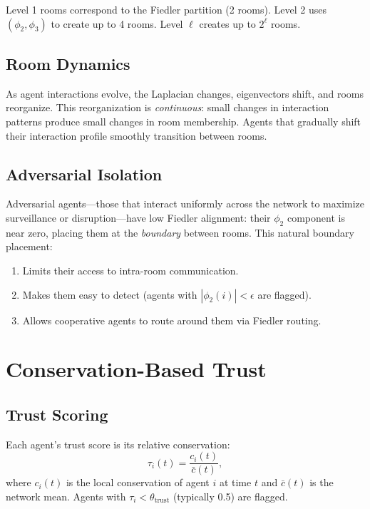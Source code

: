 \documentclass[11pt,a4paper]{article}
\begin{document}
Level 1 rooms correspond to the Fiedler partition (2 rooms).  Level 2 uses
$(\phi_2, \phi_3)$ to create up to 4 rooms.  Level $\ell$ creates up to
$2^\ell$ rooms.

\subsection{Room Dynamics}

As agent interactions evolve, the Laplacian changes, eigenvectors shift, and
rooms reorganize.  This reorganization is \emph{continuous}: small changes in
interaction patterns produce small changes in room membership.  Agents that
gradually shift their interaction profile smoothly transition between rooms.

\subsection{Adversarial Isolation}

Adversarial agents---those that interact uniformly across the network to
maximize surveillance or disruption---have low Fiedler alignment: their
$\phi_2$ component is near zero, placing them at the \emph{boundary} between
rooms.  This natural boundary placement:
\begin{enumerate}
  \item Limits their access to intra-room communication.
  \item Makes them easy to detect (agents with $|\phi_2(i)| < \epsilon$ are
        flagged).
  \item Allows cooperative agents to route around them via Fiedler routing.
\end{enumerate}

\section{Conservation-Based Trust}
\label{sec:trust}

\subsection{Trust Scoring}

Each agent's trust score is its relative conservation:
\[
  \tau_i(t) = \frac{c_i(t)}{\bar{c}(t)},
\]
where $c_i(t)$ is the local conservation of agent $i$ at time $t$ and
$\bar{c}(t)$ is the network mean.  Agents with $\tau_i < \theta_{\mathrm{trust}}$
(typically 0.5) are flagged.
\end{document}
